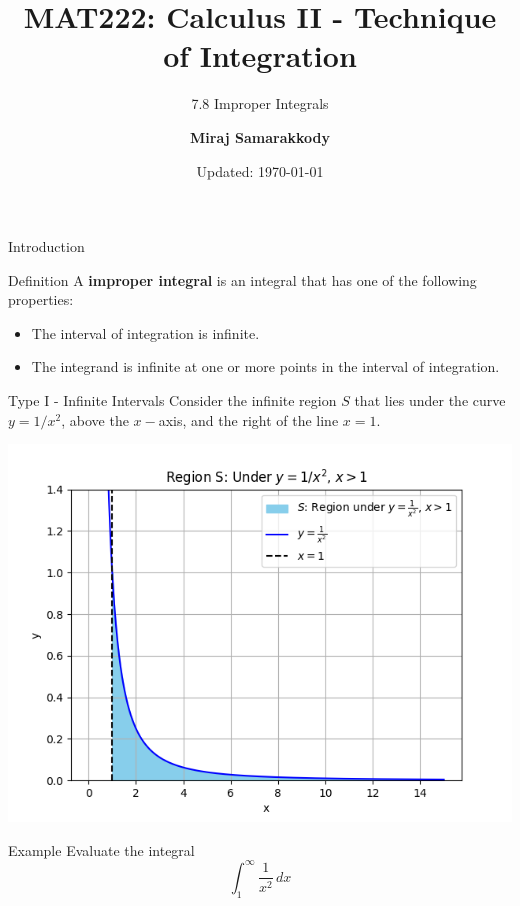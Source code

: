 \documentclass{beamer}
\title{MAT222: Calculus II - Technique of Integration}
\subtitle{7.8 Improper Integrals}
\author{\textbf{Miraj Samarakkody}}
\institute{Tougaloo College}
\date{Updated: \today}
\begin{document}
\begin{frame}
    \titlepage
\end{frame}


\begin{frame}{Introduction}
    
    \begin{block}{Definition}
        A \textbf{improper integral} is an integral that has one of the following properties:
        \begin{itemize}
            \item The interval of integration is infinite.
            \item The integrand is infinite at one or more points in the interval of integration.
        \end{itemize}
    \end{block}
\end{frame}

\begin{frame}{Type I - Infinite Intervals}
    Consider the infinite region \(S\) that lies under the curve \(y=1/x^2\), above the \(x-\)axis, and the right of the line \(x=1\). 

    \includegraphics[scale=0.5]{figures/fig_2.png}
\end{frame}

\begin{frame}{Example}
    Evaluate the integral
    \[
        \int_1^\infty \frac{1}{x^2} \, dx
    \]
\end{frame}
\end{document}
